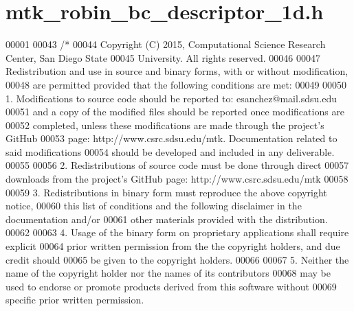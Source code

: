 \hypertarget{mtk__robin__bc__descriptor__1d_8h_source}{\section{mtk\+\_\+robin\+\_\+bc\+\_\+descriptor\+\_\+1d.\+h}
\label{mtk__robin__bc__descriptor__1d_8h_source}
}

\begin{DoxyCode}
00001 
00043 \textcolor{comment}{/*}
00044 \textcolor{comment}{Copyright (C) 2015, Computational Science Research Center, San Diego State}
00045 \textcolor{comment}{University. All rights reserved.}
00046 \textcolor{comment}{}
00047 \textcolor{comment}{Redistribution and use in source and binary forms, with or without modification,}
00048 \textcolor{comment}{are permitted provided that the following conditions are met:}
00049 \textcolor{comment}{}
00050 \textcolor{comment}{1. Modifications to source code should be reported to: esanchez@mail.sdsu.edu}
00051 \textcolor{comment}{and a copy of the modified files should be reported once modifications are}
00052 \textcolor{comment}{completed, unless these modifications are made through the project's GitHub}
00053 \textcolor{comment}{page: http://www.csrc.sdsu.edu/mtk. Documentation related to said modifications}
00054 \textcolor{comment}{should be developed and included in any deliverable.}
00055 \textcolor{comment}{}
00056 \textcolor{comment}{2. Redistributions of source code must be done through direct}
00057 \textcolor{comment}{downloads from the project's GitHub page: http://www.csrc.sdsu.edu/mtk}
00058 \textcolor{comment}{}
00059 \textcolor{comment}{3. Redistributions in binary form must reproduce the above copyright notice,}
00060 \textcolor{comment}{this list of conditions and the following disclaimer in the documentation and/or}
00061 \textcolor{comment}{other materials provided with the distribution.}
00062 \textcolor{comment}{}
00063 \textcolor{comment}{4. Usage of the binary form on proprietary applications shall require explicit}
00064 \textcolor{comment}{prior written permission from the the copyright holders, and due credit should}
00065 \textcolor{comment}{be given to the copyright holders.}
00066 \textcolor{comment}{}
00067 \textcolor{comment}{5. Neither the name of the copyright holder nor the names of its contributors}
00068 \textcolor{comment}{may be used to endorse or promote products derived from this software without}
00069 \textcolor{comment}{specific prior written permission.}

\end{DoxyCode}
